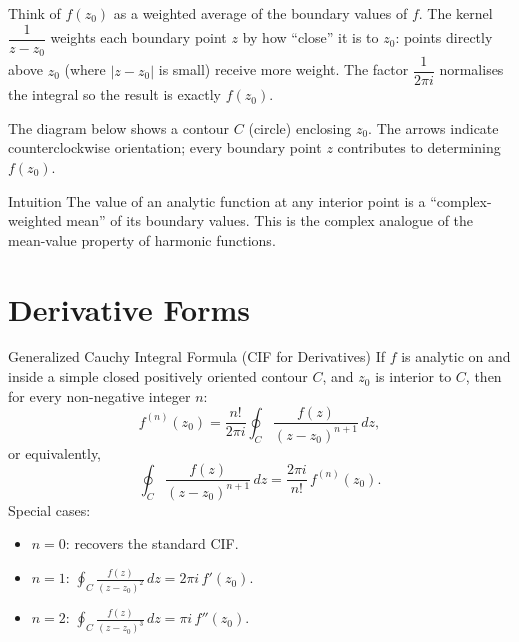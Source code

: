 \documentclass[12pt,a4paper]{article}
\begin{document}
Think of $f(z_0)$ as a weighted average of the boundary values of $f$.
The kernel $\dfrac{1}{z - z_0}$ weights each boundary point $z$ by how
``close'' it is to $z_0$: points directly above $z_0$ (where $|z - z_0|$
is small) receive more weight.  The factor $\dfrac{1}{2\pi i}$ normalises
the integral so the result is exactly $f(z_0)$.

The diagram below shows a contour $C$ (circle) enclosing $z_0$.
The arrows indicate counterclockwise orientation; every boundary point $z$
contributes to determining $f(z_0)$.

\begin{center}
\end{center}

\begin{learnbox}{Intuition}
The value of an analytic function at any interior point is a ``complex-weighted mean''
of its boundary values.  This is the complex analogue of the mean-value property of
harmonic functions.
\end{learnbox}

\section{Derivative Forms}

\begin{infobox}{Generalized Cauchy Integral Formula (CIF for Derivatives)}
If $f$ is analytic on and inside a simple closed positively oriented contour $C$,
and $z_0$ is interior to $C$, then for every non-negative integer $n$:
\[
  f^{(n)}(z_0) = \frac{n!}{2\pi i} \oint_{C} \frac{f(z)}{(z - z_0)^{n+1}}\,dz,
\]
or equivalently,
\[
  \oint_{C} \frac{f(z)}{(z - z_0)^{n+1}}\,dz = \frac{2\pi i}{n!}\,f^{(n)}(z_0).
\]
Special cases:
\begin{itemize}[noitemsep]
  \item $n = 0$: recovers the standard CIF.
  \item $n = 1$: $\displaystyle\oint_{C} \frac{f(z)}{(z-z_0)^{2}}\,dz = 2\pi i\,f'(z_0)$.
  \item $n = 2$: $\displaystyle\oint_{C} \frac{f(z)}{(z-z_0)^{3}}\,dz = \pi i\,f''(z_0)$.
\end{itemize}
\end{infobox}
\end{document}

